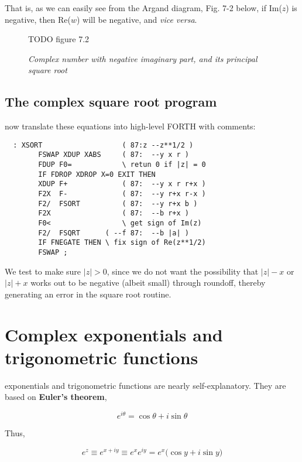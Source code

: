 That is, as we can easily see from the Argand diagram, Fig. 7-2 below, if Im($z$) is negative, then Re($w$) will be negative, and \textit{vice versa}.

\begin{figure}
    \center
    TODO figure 7.2
    \caption{\textit{Complex number with negative imaginary part, and its principal square root}}
    \label{fig:07_02}
\end{figure}

\subsection{The complex square root program}
 now translate these equations into high-level FORTH with comments:

\begin{lstlisting}
  : XSORT                   ( 87:z --z**1/2 )
        FSWAP XDUP XABS     ( 87:  --y x r )
        FDUP F0=            \ retun 0 if |z| = 0
        IF FDROP XDROP X=0 EXIT THEN
        XDUP F+             ( 87:  --y x r r+x )
        F2X  F-             ( 87:  --y r+x r-x )
        F2/  FSORT          ( 87:  --y r+x b )
        F2X                 ( 87:  --b r+x )
        F0<                 \ get sign of Im(z)
        F2/  FSQRT      ( --f 87:  --b |a| )
        IF FNEGATE THEN \ fix sign of Re(z**1/2)
        FSWAP ;
\end{lstlisting}

We test to make sure $\lvert z \rvert > 0$, since we do not want the possibility that $\lvert z \rvert - x$ or $\lvert z \rvert + x$ works out to be negative (albeit small) through roundoff, thereby generating an error in the square root routine.

\section{Complex exponentials and trigonometric functions}
 exponentials and trigonometric functions are nearly self-explanatory. They are based on \textbf{Euler's theorem},

\begin{equation*}
  e^{i\theta} = \cos\theta + i \sin\theta
\end{equation*}

Thus,

\begin{equation}
  e^z \equiv e^{x + iy} \equiv e^x e^{iy} = e^x\big(\cos y + i \sin y\big)
\end{equation}


